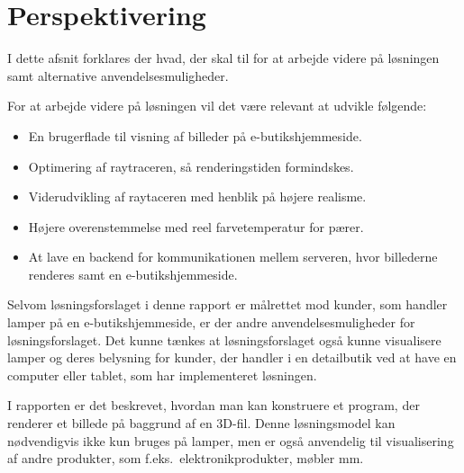 \section{Perspektivering}
I dette afsnit forklares der hvad, der skal til for at arbejde videre på løsningen samt alternative anvendelsesmuligheder. 

For at arbejde videre på løsningen vil det være relevant at udvikle følgende:

\begin{itemize}
\item En brugerflade til visning af billeder på e-butikshjemmeside.
\item Optimering af raytraceren, så renderingstiden formindskes. 
\item Viderudvikling af raytaceren med henblik på højere realisme.
\item Højere overenstemmelse med reel farvetemperatur for pærer.  
\item At lave en backend for kommunikationen mellem serveren, hvor billederne renderes samt en e-butikshjemmeside.
\end{itemize}

Selvom løsningsforslaget i denne rapport er målrettet mod kunder, som handler lamper på en e-butikshjemmeside, er der andre anvendelsesmuligheder for løsningsforslaget. Det kunne tænkes at løsningsforslaget også kunne visualisere lamper og deres belysning for kunder, der handler i en detailbutik ved at have en computer eller tablet, som har implementeret løsningen. 

I rapporten er det beskrevet, hvordan man kan konstruere et program, der renderer et billede på baggrund af en 3D-fil. Denne løsningsmodel kan nødvendigvis ikke kun bruges på lamper, men er også anvendelig til visualisering af andre produkter, som f.eks.\ elektronikprodukter, møbler mm.

\clearpage